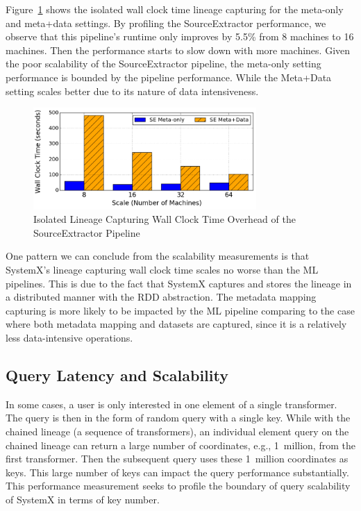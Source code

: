 \documentclass{sig-alternate}
\begin{document}
Figure~\ref{fig:SE-overhead} shows the isolated wall clock time lineage capturing for the meta-only and meta+data settings.
By profiling the SourceExtractor performance, we observe that this pipeline's runtime only improves by 5.5\% from 8 machines
to 16 machines. Then the performance starts to slow down with more machines.
Given the poor scalability of the SourceExtractor pipeline, the meta-only setting performance is bounded by the pipeline performance.
While the Meta+Data setting scales better due to its nature of data intensiveness.
\begin{figure}[t]
\begin{center}
    \includegraphics[width=85mm]{pictures/Overhead-Time-SE}
\caption {Isolated Lineage Capturing Wall Clock Time Overhead of the SourceExtractor Pipeline
    \label{fig:SE-overhead}
}
\end{center}
\end{figure}

One pattern we can conclude from the scalability measurements is that SystemX's lineage capturing wall clock time scales no worse than the ML pipelines.
This is due to the fact that SystemX captures and stores the lineage in a distributed manner with the RDD abstraction. 
The metadata mapping capturing is more likely to be impacted by the ML pipeline comparing to the case where both metadata
mapping and datasets are captured, since it is a relatively less data-intensive operations.


\subsection{Query Latency and Scalability}
In some cases, a user is only interested in one element of a single transformer.
The query is then in the form of random query with a single key.
While with the chained lineage (a sequence of transformers), an individual element query 
on the chained lineage can return a large number of coordinates, e.g., 1~million, from
the first transformer. 
Then the subsequent query uses these 1~million coordinates as keys.
This large number of keys can impact the query performance substantially.  
This performance measurement seeks to profile the boundary of query scalability of SystemX in terms of key number. 
\end{document}
